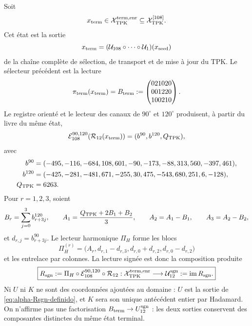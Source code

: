 \begin{definition}
Soit
\[
 x_{\rm term}\in\mathcal X_{\rm TPK}^{\rm term,enr}
 \subseteq\mathcal X_{\rm TPK}^{[108]}.
\]
Cet état est la sortie
\[
 x_{\rm term}
 =(\mathcal U_{108}\circ\cdots\circ\mathcal U_1)(x_{\rm seed})
\]
de la chaîne complète de sélection, de transport et de mise à jour du TPK.
Le sélecteur précédent est la lecture
\[
 \pi_{\rm term}(x_{\rm term})
 =B_{\rm term}
 :=\begin{pmatrix}021020\\001220\\100210\end{pmatrix}.
\]
Le registre orienté et le lecteur des canaux de \(90^\circ\) et
\(120^\circ\) produisent, à partir du livre du même état,
\begin{equation}\label{eq:alpha-subespacio-firmado}
 \mathcal E_{108}^{90,120}\!
 \left(\mathcal R_{12}(x_{\rm term})\right)
 =(b^{90},b^{120},Q_{\rm TPK}),
\end{equation}
avec
\[
\begin{aligned}
 b^{90}={}&(-495,-116,-684,108,601,-90,
             -173,-88,313,560,-397,461),\\
 b^{120}={}&(-425,-281,-481,671,-255,30,
              475,-543,680,251,6,-128),\\
 Q_{\rm TPK}={}&6263.
\end{aligned}
\]
Pour \(r=1,2,3\), soient
\[
 B_r=\sum_{j=0}^{3}b^{120}_{r+3j},\qquad
 A_1=\frac{Q_{\rm TPK}+2B_1+B_2}{3},\qquad
 A_2=A_1-B_1,\qquad A_3=A_2-B_2,
\]
et \(d_{r,j}=b^{90}_{r+3j}\). Le lecteur harmonique \(\Pi_H\) forme les
blocs
\begin{equation}\label{eq:alpha-modulo-imagen-H12}
 \Pi_H^{(r)}
 =\bigl(A_r,d_{r,1}-d_{r,3},
              d_{r,0}+d_{r,2},d_{r,0}-d_{r,2}\bigr)
\end{equation}
et les entrelace par colonnes. La lecture signée est donc la
composition produite
\begin{equation}\label{eq:alpha-Rsgn-definido}
 \boxed{
 R_{\rm sgn}:=
 \Pi_H\circ\mathcal E_{108}^{90,120}\circ\mathcal R_{12}:
 \mathcal X_{\rm TPK}^{\rm term,enr}
 \longrightarrow
 \mathcal U_{12}^{\rm sgn}:=\operatorname{im}R_{\rm sgn}.}
\end{equation}
Ni \(U\) ni \(K\) ne sont des coordonnées ajoutées au domaine : \(U\) est la sortie
de \eqref{eq:alpha-Rsgn-definido}, et \(K\) sera son unique antécédent entier
par Hadamard.
On n'affirme pas une factorisation
\(B_{\rm term}\to U_{12}^{\rm sgn}\) : les deux sorties conservent des composantes
distinctes du même état terminal.


\end{definition}
